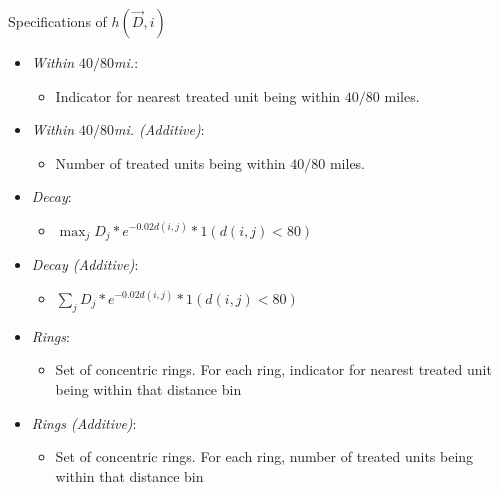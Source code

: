 \documentclass[aspectratio=169]{beamer}
\begin{document}
\begin{frame}{Specifications of $h(\vec{D}, i)$}
    
    \begin{itemize}
        \item \textit{Within $40/80$mi.}:
        \begin{itemize}
            \item Indicator for nearest treated unit being within $40/80$ miles.
        \end{itemize}
        
        \item \textit{Within $40/80$mi. (Additive)}: 
        \begin{itemize}
            \item Number of treated units being within $40/80$ miles.
        \end{itemize}
        
        \item \textit{Decay}: 
        \begin{itemize}
            \item $\max_j D_j * e^{-0.02 d(i,j)} * 1(d(i,j) < 80)$
        \end{itemize}
        
        \item \textit{Decay (Additive)}: 
        \begin{itemize}
            \item $\sum_j D_j * e^{-0.02 d(i,j)} * 1(d(i,j) < 80)$
        \end{itemize}
        
        \item \textit{Rings}: 
        \begin{itemize}
            \item Set of concentric rings. For each ring, indicator for nearest treated unit being within that distance bin
        \end{itemize}
        
        \item \textit{Rings (Additive)}: 
        \begin{itemize}
            \item Set of concentric rings. For each ring, number of treated units being within that distance bin
        \end{itemize}
    \end{itemize}

\end{frame}
\end{document}
